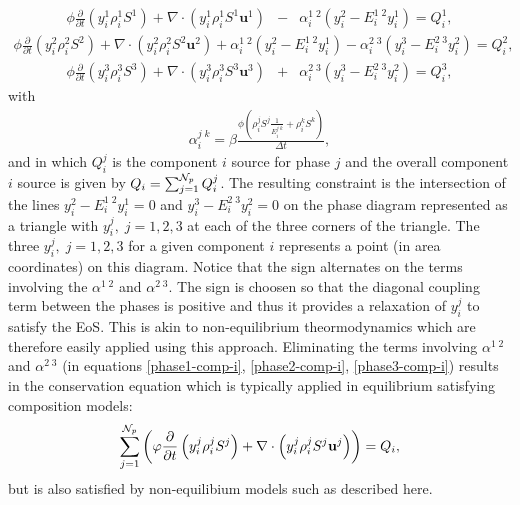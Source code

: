 \begin{eqnarray}
\phi  \displaystyle\frac{\partial}{\partial t}\left(y_{i}^{1}\rho_i^{1}S^{1} \right) +
\nabla\cdot\left(y_{i}^{1}\rho_i^{1}S^{1}\mathbf{u}^{1}  \right) &-& \alpha_i^{1\;2} (y_i^2 - E_i^{1\;2} y_i^1)  = Q_i^1 ,
\label{phase1-comp-i}
\end{eqnarray}
\begin{eqnarray}
\phi \displaystyle\frac{\partial}{\partial t}\left(y_{i}^{2}\rho_i^{2}S^{2}  \right) +
 \nabla\cdot\left( y_{i}^{2}\rho_i^{2}S^{2}\mathbf{u}^{2}  \right) + \alpha_i^{1\;2} (y_i^2 - E_i^{1\;2} y_i^1)   - \alpha_i^{2\;3} (y_i^3 - E_i^{2\;3} y_i^2) = Q_i^2 ,
\label{phase2-comp-i}
\end{eqnarray}
\begin{eqnarray}
\phi \displaystyle\frac{\partial}{\partial t}\left(y_{i}^{3}\rho_i^{3}S^{3}  \right) +
 \nabla\cdot\left( y_{i}^{3}\rho_i^{3}S^{3}\mathbf{u}^{3}  \right) &+&  \alpha_i^{2\;3} (y_i^3 - E_i^{2\;3} y_i^2) = Q_i^3  ,
\label{phase3-comp-i}
\end{eqnarray}
with
\begin{eqnarray}
 \alpha_i^{j\;k} = \beta \frac{\phi (\rho_i^j S^j
 \frac{1}{E_i^{j\;k}}
 +\rho_i^k S^k )}{\Delta t} ,
\end{eqnarray}
and in which $Q_i^j$ is the component $i$ source for phase $j$
and the overall component $i$ source is given by $Q_i=\sum_{j=1}^{{\cal N}_p} Q_i^j$.
The resulting constraint
is the intersection of the lines $y_i^2 - E_i^{1\;2} y_i^1=0$ and
$y_i^3 - E_i^{2\;3} y_i^2= 0$ on the phase diagram represented as a triangle
with $y_i^j, \; j =1,2,3$ at each of the three corners of the triangle.
The three $y_i^j, \; j =1,2,3$ for a given component $i$ represents a point (in area coordinates)
on this diagram. Notice that the sign alternates on the
terms involving the $\alpha^{1\;2}$ and $\alpha^{2\;3}$.
The sign is choosen so
that the diagonal coupling term between
the phases is positive and thus it provides
a relaxation of $y_i^j$ to satisfy the EoS. This is
akin to non-equilibrium theormodynamics which are therefore easily
applied using this approach.
Eliminating the terms involving $\alpha^{1\;2}$
and $ \alpha^{2\;3} $ (in equations \ref{phase1-comp-i}, \ref{phase2-comp-i}, \ref{phase3-comp-i}) results in the conservation equation
which is typically applied in equilibrium satisfying composition models:
\begin{eqnarray}
\sum_{j=1}^{{\cal N}_p}  \left(
\phi  \displaystyle\frac{\partial}{\partial t}\left(y_{i}^{j}\rho_i^{j}S^{j} \right) +
\nabla\cdot\left(y_{i}^{j}\rho_i^{j}S^{j}\mathbf{u}^{j}  \right)  \right) = Q_i,
\end{eqnarray}
but is also satisfied by non-equilibium models such as described here.

